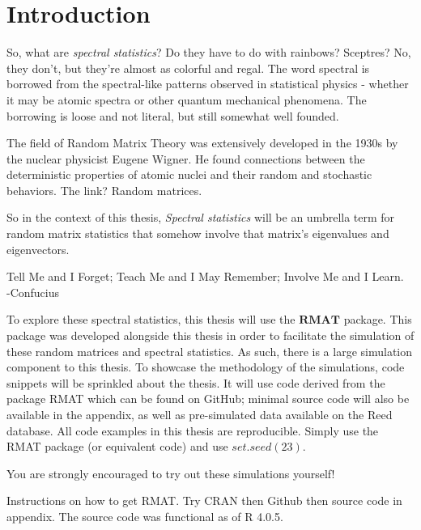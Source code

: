 
  \chapter*{Introduction}


So, what are \textit{spectral statistics}? Do they have to do with rainbows? Sceptres? No, they don’t, but they’re almost as colorful and regal. The word spectral is borrowed from the spectral-like patterns observed in statistical physics - whether it may be atomic spectra or other quantum mechanical phenomena. The borrowing is loose and not literal, but still somewhat well founded.

The field of Random Matrix Theory was extensively developed in the 1930s by the nuclear physicist Eugene Wigner. He found connections between the deterministic properties of atomic nuclei and their random and stochastic behaviors. The link? Random matrices.

So in the context of this thesis, \textit{Spectral statistics} will be an umbrella term for random matrix statistics that somehow involve that matrix's eigenvalues and eigenvectors.




\begin{displayquote}
Tell Me and I Forget; Teach Me and I May Remember; Involve Me and I Learn. \\
-Confucius
\end{displayquote}

To explore these spectral statistics, this thesis will use the $\textbf{RMAT}$ package. This package was developed alongside this thesis in order to facilitate the simulation of these random matrices and spectral statistics. As such, there is a large simulation component to this thesis. To showcase the methodology of the simulations, code snippets will be sprinkled about the thesis. It will use code derived from the package RMAT which can be found on GitHub; minimal source code will also be available in the appendix, as well as pre-simulated data available on the Reed database. All code examples in this thesis are reproducible. Simply use the RMAT package (or equivalent code) and use $set.seed(23)$.

You are strongly encouraged to try out these simulations yourself!

Instructions on how to get RMAT. Try CRAN then Github then source code in appendix. The source code was functional as of R 4.0.5.
